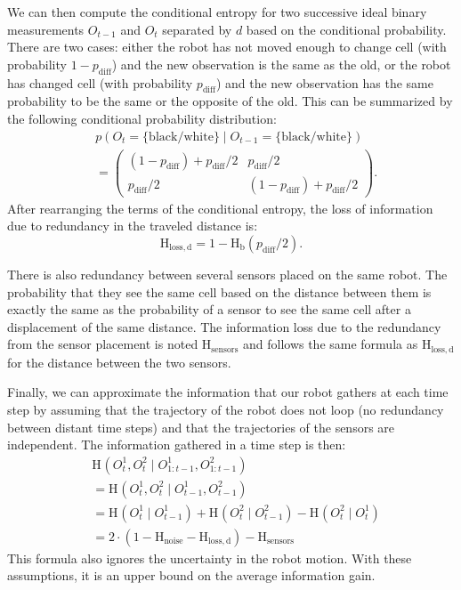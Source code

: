 \documentclass[letterpaper, 10pt, conference]{ieeeconf}
\newcommand{\ent}[1]{\mathrm{H}_\mathrm{#1}} %
\begin{document}
We can then compute the conditional entropy for two successive ideal binary measurements $O_{t-1}$ and $O_t$ separated by $d$ based on the conditional probability.
There are two cases: either the robot has not moved enough to change cell (with probability $1 - p_\mathrm{diff}$) and the new observation is the same as the old, or the robot has changed cell (with probability $p_\mathrm{diff}$) and the new observation has the same probability to be the same or the opposite of the old.
This can be summarized by the following conditional probability distribution:
\begin{align*}
	&p(O_t=\{\mathrm{black}/\mathrm{white}\} \mid O_{t-1}=\{\mathrm{black}/\mathrm{white}\})\\
	&= \begin{pmatrix}
		(1 - p_\mathrm{diff}) + p_\mathrm{diff}/2 & p_\mathrm{diff}/2\\
		p_\mathrm{diff}/2 & (1 - p_\mathrm{diff}) + p_\mathrm{diff}/2
	\end{pmatrix}.
\end{align*}
After rearranging the terms of the conditional entropy, the loss of information due to redundancy in the traveled distance is:
\begin{displaymath}
	\ent{loss,d} = 1 - \ent{b}(p_\mathrm{diff}/2).
\end{displaymath}

There is also redundancy between several sensors placed on the same robot.
The probability that they see the same cell based on the distance between them is exactly the same as the probability of a sensor to see the same cell after a displacement of the same distance.
The information loss due to the redundancy from the sensor placement is noted $\ent{sensors}$ and follows the same formula as $\ent{loss,d}$ for the distance between the two sensors.

Finally, we can approximate the information that our robot gathers at each time step by assuming that the trajectory of the robot does not loop (no redundancy between distant time steps) and that the trajectories of the sensors are independent. 
The information gathered in a time step is then:
\begin{align*}
	&\ent{}(O^1_t, O^2_t \mid O^1_{1:t-1}, O^2_{1:t-1})\\
	&= \ent{}(O^1_t, O^2_t \mid O^1_{t-1}, O^2_{t-1}) \\
	&= \ent{}(O^1_t \mid O^1_{t-1}) + \ent{}(O^2_t \mid O^2_{t-1}) - \ent{}(O^2_t \mid O^1_t) \\
	&= 2\cdot(1-\ent{noise}-\ent{loss,d}) - \ent{sensors}%
\end{align*}
This formula also ignores the uncertainty in the robot motion.
With these assumptions, it is an upper bound on the average information gain.
\end{document}
